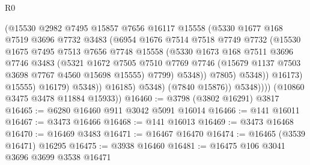 \begin{lexlean}{R0}
\begin{coremodule}
                              (@15530
                                @2982
                                @7495
                                @15857
                                @7656
                                @16117
                                @15558
                                (@5330
                                  @1677
                                  @168
                                  @7519
                                  @3696
                                  @7732
                                  @3483
                                  (@6954
                                    @1676
                                    @7514
                                    @7518
                                    @7749
                                    @7732
                                    (@15530
                                      @1675
                                      @7495
                                      @7513
                                      @7656
                                      @7748
                                      @15558
                                      (@5330
                                        @1673
                                        @168
                                        @7511
                                        @3696
                                        @7746
                                        @3483
                                        (@5321
                                          @1672
                                          @7505
                                          @7510
                                          @7769
                                          @7746
                                          (@15679 @1137 @7503 @3698 @7767 @4560 @15698 @15555)
                                          @7799)
                                        @5348))
                                    @7805)
                                  @5348))
                              @16173)
                            @15555)
                          @16179)
                        @5348))
                    @16185)
                  @5348)
                (@7840 @15876))
              @5348))))
      (@10860 @3475 @3478 @11884 @15933))
@16460 := @3798 (@3802 @16291) @3817
@16465 := @6280 @16460 @911 @3042 @5091 @16014
@16466 := @141 @16011
@16467 := @3473 @16466
@16468 := @141 @16013
@16469 := @3473 @16468
@16470 := @16469 @3483
@16471 := @16467 @16470
@16474 := @16465 (@3539 @16471) @16295
@16475 := @3938 @16460
@16481 := @16475 @106 @3041 @3696 @3699 @3538 @16471

\end{coremodule}
\end{lexlean}
